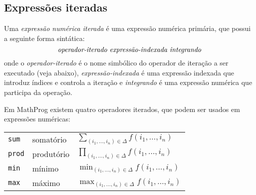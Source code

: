 \documentclass[11pt, brazil]{report}
\begin{document}
\subsection{Expressões iteradas}
\label{itexpr}

Uma {\it expressão numérica iterada} é uma expressão numérica primária,
que possui a seguinte forma sintática:
$$\mbox{\it operador-iterado expressão-indexada integrando}$$
onde o {\it operador-iterado} é o nome simbólico do operador de iteração
a ser executado (veja abaixo), {\it expressão-indexada} é uma
expressão indexada que introduz índices e controla a iteração e
{\it integrando} é uma expressão numérica que participa da operação.

\noindent
Em MathProg existem quatro operadores iterados, que podem ser usados
em expressões numéricas:

%

{\def\arraystretch{2}
\noindent\hfil
\begin{tabular}{@{}lll@{}}
{\tt sum}&somatório&$\displaystyle\sum_{(i_1,\dots,i_n)\in\Delta}
f(i_1,\dots,i_n)$\\
{\tt prod}&produtório&$\displaystyle\prod_{(i_1,\dots,i_n)\in\Delta}
f(i_1,\dots,i_n)$\\
{\tt min}&mínimo&$\displaystyle\min_{(i_1,\dots,i_n)\in\Delta}
f(i_1,\dots,i_n)$\\
{\tt max}&máximo&$\displaystyle\max_{(i_1,\dots,i_n)\in\Delta}
f(i_1,\dots,i_n)$\\
\end{tabular}
}

\end{document}
